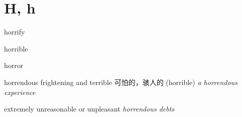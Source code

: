 \section{H, h}

\begin{DefWord}{horrify}
\end{DefWord}

\begin{DefWord}{horrible}
\end{DefWord}

\begin{DefWord}{horror}
\end{DefWord}

\begin{DefWord}{horrendous}
    frightening and terrible 可怕的，骇人的 (horrible)
    \textit{a horrendous experience}

    extremely unreasonable or unpleasant
    \textit{horrendous debts}
\end{DefWord}

